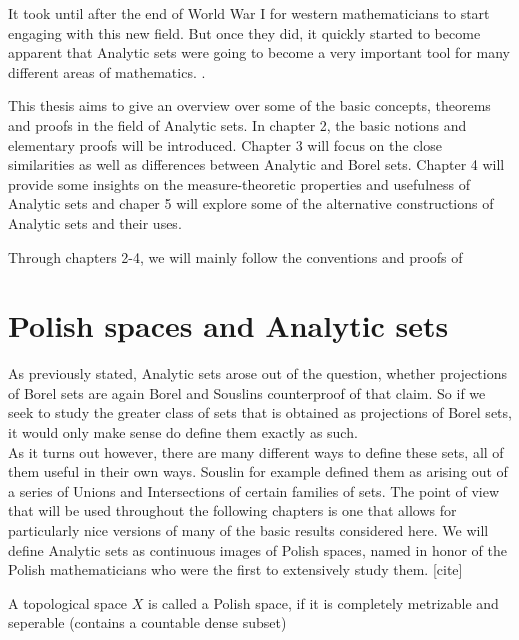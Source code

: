 \documentclass[10pt, a4paper, titlepage]{article}
\numberwithin{equation}{section}
\begin{document}
It took until after the end of World War I for western mathematicians to start engaging with this new field. 
But once they did, it quickly started to become apparent that Analytic sets were going to become a very important tool for many different areas of mathematics. \cite{Moschovakis1987} \cite{rogers1980}.

This thesis aims to give an overview over some of the basic concepts, theorems and proofs in the field of Analytic sets. 
In chapter 2, the basic notions and elementary proofs will be introduced. Chapter 3 will focus on the close similarities as well as differences between Analytic and Borel sets. Chapter 4 will provide some insights on the measure-theoretic properties and usefulness of Analytic sets and chaper 5 will explore some of the alternative constructions of Analytic sets and their uses. 

Through chapters 2-4, we will mainly follow the conventions and proofs of \cite{cohn2013}




\section{Polish spaces and Analytic sets}
As previously stated, Analytic sets arose out of the question, whether projections of Borel sets are again Borel and Souslins counterproof of that claim. 
So if we seek to study the greater class of sets that is obtained as projections of Borel sets, it would only make sense do define them exactly as such.\\ 
As it turns out however, there are many different ways to define these sets, all of them useful in their own ways. Souslin for example defined them as arising out of a series of Unions and Intersections of certain families of sets.
The point of view that will be used throughout the following chapters is one that allows for particularly nice versions of many of the basic results considered here.
We will define Analytic sets as continuous images of Polish spaces, named in honor of the Polish mathematicians who were the first to extensively study them. [cite]



\begin{definition}
	A topological space $X$ is called a Polish space, if it is completely metrizable and seperable (contains a countable dense subset)
\end{definition}
\end{document}
